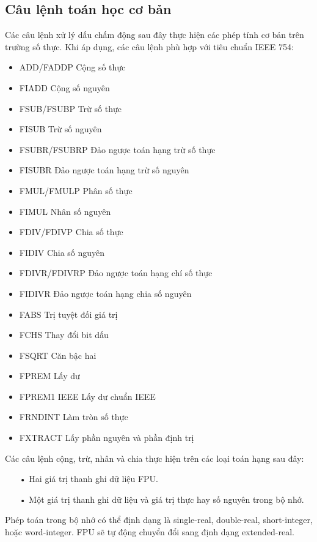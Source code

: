 		\subsection*{Câu lệnh toán học cơ bản}
		Các câu lệnh xử lý dấu chấm động sau đây thực hiện các phép tính cơ bản trên trường số thực. Khi áp dụng, các câu lệnh phù hợp với tiêu chuẩn IEEE 754:
		\begin{itemize}
			\renewcommand{\labelitemi}{}
			\item	 ADD/FADDP Cộng số thực
			\item	FIADD Cộng số nguyên
			\item	FSUB/FSUBP Trừ số thực
			\item	FISUB Trừ số nguyên
			\item	FSUBR/FSUBRP Đảo ngược toán hạng trừ số thực
			\item	FISUBR Đảo ngược toán hạng trừ số nguyên
			\item	FMUL/FMULP Phân số thực
			\item	FIMUL Nhân số nguyên
			\item	FDIV/FDIVP Chia số thực
			\item	FIDIV Chia số nguyên
			\item	FDIVR/FDIVRP Đảo ngược toán hạng chí số thực
			\item	FIDIVR Đảo ngược toán hạng chia số nguyên
			\item	FABS Trị tuyệt đối giá trị
			\item	FCHS Thay đổi bit dấu
			\item	FSQRT Căn bậc hai
			\item	FPREM Lấy dư
			\item	FPREM1 IEEE Lấy dư chuẩn IEEE
			\item	FRNDINT Làm tròn số thực
			\item	FXTRACT Lấy phần nguyên và phần định trị
		\end{itemize}		
	
	Các câu lệnh cộng, trừ, nhân và chia thực hiện trên các loại toán hạng sau đây:
		\begin{itemize}
			\item[•]	Hai giá trị thanh ghi dữ liệu FPU.
			\item[•]   Một giá trị thanh ghi dữ liệu và giá trị thực hay số nguyên trong bộ nhớ.
		\end{itemize}
 
		Phép toán trong bộ nhớ có thể định dạng là single-real, double-real, short-integer, hoặc word-integer. FPU sẽ tự động chuyển đổi sang định dạng extended-real. \\
		
